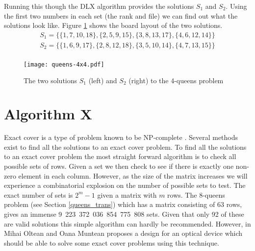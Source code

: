 \begin{example}
Running this though the DLX algorithm provides the solutions $S_1$ and $S_2$.
Using the first two numbers in each set (the rank and file) we can find out what the solutions look like.
Figure \ref{fig:4queens} shows the board layout of the two solutions.
\begin{align*}
S_1 = \{ \{ 1, 7, 10, 18 \}, \{ 2, 5, 9, 15 \}, \{ 3, 8, 13, 17 \}, \{ 4, 6, 12, 14 \}  \}	\\
S_2 = \{ \{ 1, 6, 9, 17 \}, \{ 2, 8, 12, 18 \}, \{ 3, 5, 10, 14 \}, \{ 4, 7, 13, 15 \}  \}	\\
\end{align*}

\begin{figure}[hptb]
	\centering 
	\texttt{[image: queens-4x4.pdf]}
	\caption{The two solutions $S_1$ (left) and $S_2$ (right) to the 4-queens problem}
	\label{fig:4queens}
\end{figure}

\end{example}



\section{Algorithm X}
\label{algox}

Exact cover is a type of problem known to be NP-complete \cite{np-comp-theory}.
Several methods exist to find all the solutions to an exact cover problem.
To find all the solutions to an exact cover problem the most straight forward algorithm is to check all possible sets of rows.
Given a set we then check to see if there is exactly one non-zero element in each column.
However, as the size of the matrix increases we will experience a combinatorial explosion on the number of possible sets to test.
The exact number of sets is $2^{m}-1$ given a matrix with $m$ rows.
The 8-queens problem (see Section \ref{queens_trans}) which has a matrix consisting of 63 rows, gives an immense 9~223~372~036~854~775~808 sets.
Given that only 92 of these are valid solutions this simple algorithm can hardly be recommended.
However, in \cite{oltean-2007} Mihai Oltean and Oana Muntean proposes a design for an optical device which should be able to solve some exact cover problems using this technique.

